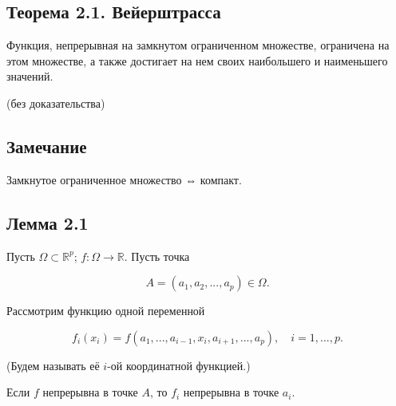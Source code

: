 {\subsection*{Теорема 2.1. Вейерштрасса}

Функция, непрерывная на замкнутом ограниченном множестве, ограничена на этом множестве, а также достигает на нем своих наибольшего и наименьшего значений.

(без доказательства)

\subsection*{Замечание}

Замкнутое ограниченное множество ⇔ компакт.

\subsection*{Лемма 2.1}

Пусть \( \Omega \subset \mathbb{R}^p \); \( f: \Omega \to \mathbb{R} \). Пусть точка 



\[
A = (a_1, a_2, ..., a_p) \in \Omega.
\]



Рассмотрим функцию одной переменной 



\[
f_i(x_i) = f(a_1, ..., a_{i-1}, x_i, a_{i+1}, ..., a_p), \quad i = 1, ..., p.
\]



(Будем называть её \( i \)-ой координатной функцией.)

Если \( f \) непрерывна в точке \( A \), то \( f_i \) непрерывна в точке \( a_i \).


}